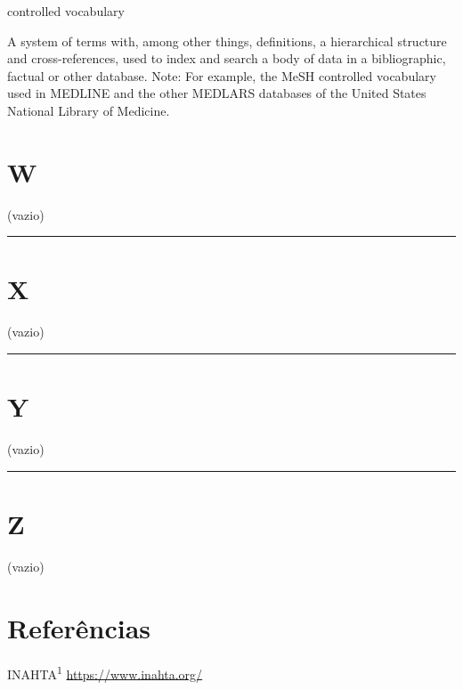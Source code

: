 \documentclass[
  openany]{book}
\begin{document}
controlled vocabulary

A system of terms with, among other things, definitions, a hierarchical structure and cross-references, used to index and search a body of data in a bibliographic, factual or other database. Note: For example, the MeSH controlled vocabulary used in MEDLINE and the other MEDLARS databases of the United States National Library of Medicine.

\hypertarget{w}{%
\chapter*{W}\label{w}}

(vazio)

\begin{center}\rule{0.5\linewidth}{0.5pt}\end{center}

\hypertarget{x}{%
\chapter*{X}\label{x}}

(vazio)

\begin{center}\rule{0.5\linewidth}{0.5pt}\end{center}

\hypertarget{y}{%
\chapter*{Y}\label{y}}

(vazio)

\begin{center}\rule{0.5\linewidth}{0.5pt}\end{center}

\hypertarget{z}{%
\chapter*{Z}\label{z}}

(vazio)

\hypertarget{referuxeancias}{%
\chapter*{Referências}\label{referuxeancias}}

INAHTA\textsuperscript{1}
\url{https://www.inahta.org/}
\end{document}
